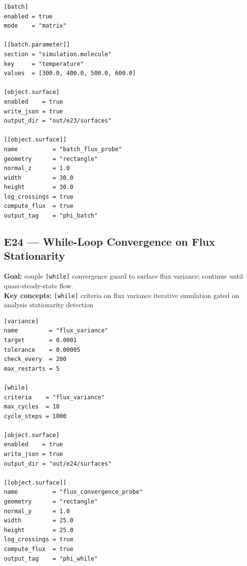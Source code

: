 \documentclass[11pt,a4paper]{article}
\begin{document}
\begin{tcolorbox}[scriptbox, scriptheader,
  title={scripts/e23\_surface\_batch\_sweep.vsim (excerpt)}]
\begin{lstlisting}[style=vsimlst]
[batch]
enabled = true
mode    = "matrix"

[[batch.parameter]]
section = "simulation.molecule"
key     = "temperature"
values  = [300.0, 400.0, 500.0, 600.0]

[object.surface]
enabled    = true
write_json = true
output_dir = "out/e23/surfaces"

[[object.surface]]
name          = "batch_flux_probe"
geometry      = "rectangle"
normal_z      = 1.0
width         = 30.0
height        = 30.0
log_crossings = true
compute_flux  = true
output_tag    = "phi_batch"
\end{lstlisting}
\end{tcolorbox}

\subsection*{E24 --- While-Loop Convergence on Flux Stationarity}

\textbf{Goal:} couple \texttt{[while]} convergence guard to surface flux
variance; continue until quasi-steady-state flow.\\
\textbf{Key concepts:} \texttt{[while]} criteria on flux variance
\textbullet{} iterative simulation gated on analysis \textbullet{}
stationarity detection

\begin{tcolorbox}[scriptbox, scriptheader,
  title={scripts/e24\_surface\_while\_loop\_convergence.vsim (excerpt)}]
\begin{lstlisting}[style=vsimlst]
[variance]
name         = "flux_variance"
target       = 0.0001
tolerance    = 0.00005
check_every  = 200
max_restarts = 5

[while]
criteria    = "flux_variance"
max_cycles  = 10
cycle_steps = 1000

[object.surface]
enabled    = true
write_json = true
output_dir = "out/e24/surfaces"

[[object.surface]]
name          = "flux_convergence_probe"
geometry      = "rectangle"
normal_y      = 1.0
width         = 25.0
height        = 25.0
log_crossings = true
compute_flux  = true
output_tag    = "phi_while"
\end{lstlisting}
\end{tcolorbox}
\end{document}

